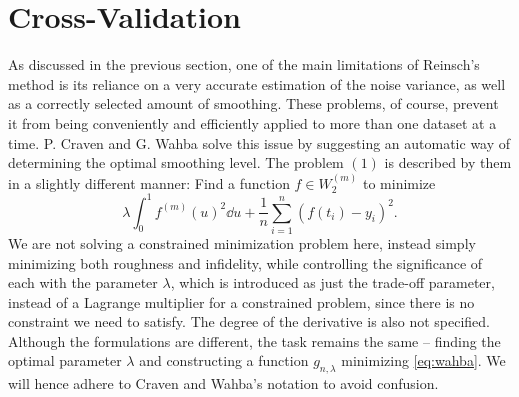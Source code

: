 \documentclass[11pt,leqno]{book}
\theoremstyle{definition}
\theoremstyle{plain}
\theoremstyle{definition}
\begin{document}
{\section{Cross-Validation}
As discussed in the previous section, one of the main limitations of Reinsch's method is its reliance on a very accurate estimation of the noise variance, as well as a correctly selected amount of smoothing. These problems, of course, prevent it from being conveniently and efficiently applied to more than one dataset at a time. P. Craven and G. Wahba \cite{Craven1978} solve this issue by suggesting an automatic way of determining the optimal smoothing level. The problem $(1)$ is described by them in a slightly different manner: Find a function $f\in W_2^{(m)}$ to minimize
\begin{equation}
    \lambda\int_{0}^{1}{f^{(m)}(u)^2\dd u} + \frac{1}{n}\sum_{i=1}^{n}({f(t_i) - {y}_i})^2 .
\label{eq:wahba}
\end{equation}
We are not solving a constrained minimization problem here, instead simply minimizing both roughness and infidelity, while controlling the significance of each with the parameter $\lambda$, which is introduced as just the trade-off parameter, instead of a Lagrange multiplier for a constrained problem, since there is no constraint we need to satisfy. The degree of the derivative is also not specified. Although the formulations are different, the task remains the same -- finding the optimal parameter $\lambda$ and constructing a function $g_{n,\lambda}$ minimizing \eqref{eq:wahba}. We will hence adhere to Craven and Wahba's notation to avoid confusion.

}
\end{document}
